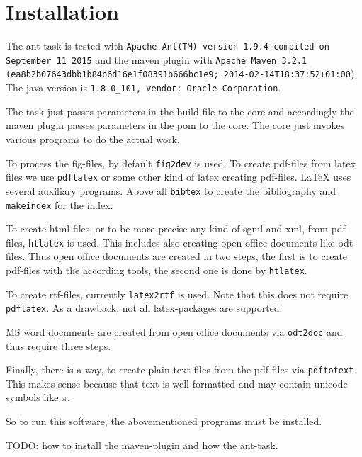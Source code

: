 \documentclass[12pt]{article}
\begin{document}


\section{Installation}

The ant task is tested with 
{\tt Apache Ant(TM) version 1.9.4 compiled on September 11 2015}
and the maven plugin with {\tt Apache Maven 3.2.1
(ea8b2b07643dbb1b84b6d16e1f08391b666bc1e9; 2014-02-14T18:37:52+01:00}). 
The java version is {\tt 1.8.0\_101, vendor: Oracle Corporation}. 

The task just passes parameters in the build file to the core 
and accordingly the maven plugin passes parameters in the pom 
to the core. 
The core just invokes various programs to do the actual work. 

To process the fig-files, by default {\tt fig2dev} is used. 
To create pdf-files from latex files we use {\tt pdflatex} 
or some other kind of latex creating pdf-files. 
LaTeX uses several auxiliary programs. 
Above all {\tt bibtex} to create the bibliography 
and {\tt makeindex} for the index. 

To create html-files, or to be more precise any kind of sgml and xml, 
from pdf-files, {\tt htlatex} is used. 
This includes also creating open office documents like odt-files. 
Thus open office documents are created in two steps, 
the first is to create pdf-files with the according tools, 
the second one is done by {\tt htlatex}. 

To create rtf-files, currently {\tt latex2rtf} is used. 
Note that this does not require {\tt pdflatex}. 
As a drawback, not all latex-packages are supported. 

MS word documents are created from open office documents via {\tt odt2doc} 
and thus require three steps. 

Finally, there is a way, to create plain text files from the pdf-files 
via {\tt pdftotext}. 
This makes sense because that text is well formatted 
and may contain unicode symbols like $\pi$. 

So to run this software, the abovementioned programs must be installed. 

TODO: how to install the maven-plugin and how the ant-task. 
\end{document}
